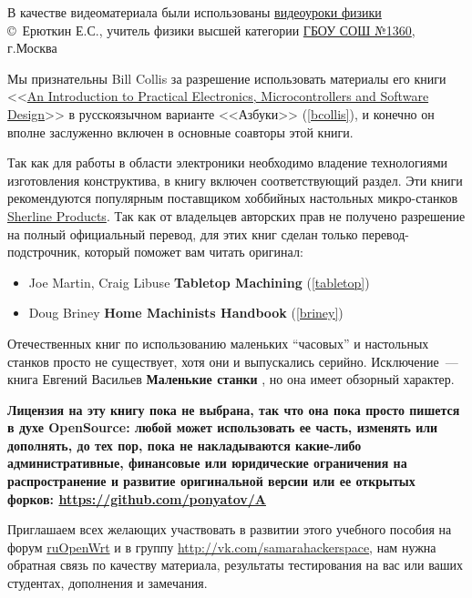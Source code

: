 \bigskip
В качестве видеоматериала были использованы 
\href{https://www.youtube.com/playlist?list=PLddc343N7YqgCWlspw08g6t0iFos9gAi4}{видеоуроки
физики}\\
\copyright\ Ерюткин Е.С., учитель физики высшей категории 
\href{http://sch1360v.mskobr.ru/}{ГБОУ СОШ №1360}, г.Москва

\bigskip
Мы признательны Bill Collis за разрешение использовать материалы его книги
<<\href{www.techideas.co.nz}{An Introduction to
Practical Electronics,
Microcontrollers and
Software Design}>> \cite{bcollis} в
русскоязычном варианте <<Азбуки>> (\ref{bcollis}), и конечно он вполне
заслуженно включен в основные соавторы этой книги.

\bigskip
Так как для работы в области электроники необходимо владение технологиями
изготовления конструктива, в книгу включен соответствующий раздел. 
Эти книги рекомендуются популярным поставщиком хоббийных настольных
микро-станков \href{http://sherline.com/}{Sherline Products}. Так как от
владельцев авторских прав не получено разрешение на полный официальный перевод,
для этих книг сделан только перевод-подстрочник, который поможет вам читать
оригинал:
\begin{itemize}
  \item Joe Martin, Craig Libuse \textbf{Tabletop Machining}
  \cite{tabletop} (\ref{tabletop})
  \item Doug Briney \textbf{Home Machinists Handbook}
  \cite{briney} (\ref{briney})
\end{itemize}

Отечественных книг по использованию маленьких ``часовых'' и настольных станков
просто не существует, хотя они и выпускались серийно. Исключение\ --- книга
Евгений Васильев \textbf{Маленькие станки} \cite{vasil}, но она имеет обзорный
характер.

\bigskip
\textbf{Лицензия на эту книгу пока не выбрана, так что она пока просто пишется в
духе OpenSource: любой может использовать ее часть, изменять или дополнять, до
тех пор, пока не накладываются какие-либо административные, финансовые или
юридические ограничения на распространение и развитие оригинальной версии или ее
открытых форков: \url{https://github.com/ponyatov/A}}
\bigskip

Приглашаем всех желающих участвовать в развитии этого учебного пособия на форум
\href{https://groups.google.com/forum/\#!forum/openwrt2ru}{ruOpenWrt} и в группу
\url{http://vk.com/samarahackerspace}, нам нужна обратная связь по качеству
материала, результаты тестирования на вас или ваших студентах, дополнения и
замечания.
